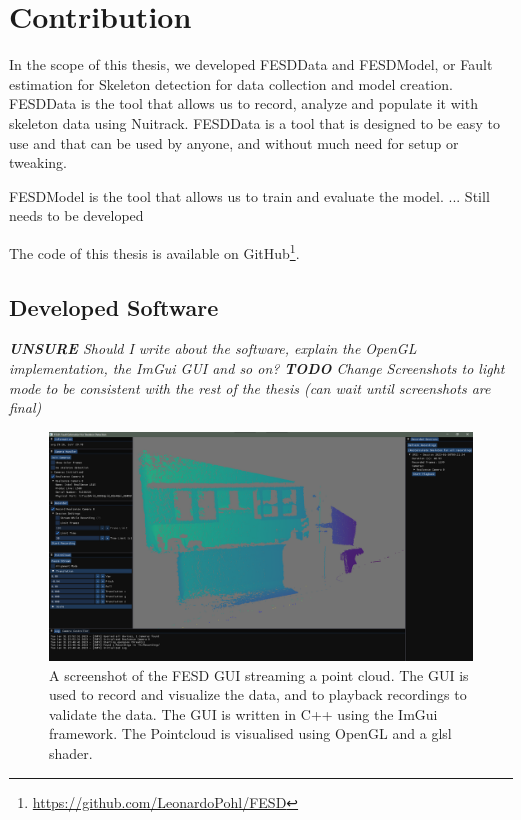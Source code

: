 \section{Contribution}
\label{sec:contribution}

In the scope of this thesis, we developed FESDData and FESDModel, or Fault estimation for Skeleton detection for data collection and model creation. FESDData is the tool that allows us to record, analyze and populate it with skeleton data using Nuitrack. FESDData is a tool that is designed to be easy to use and that can be used by anyone, and without much need for setup or tweaking.

FESDModel is the tool that allows us to train and evaluate the model. ... Still needs to be developed 

The code of this thesis is available on GitHub\footnote{\url{https://github.com/LeonardoPohl/FESD}}.

\subsection{Developed Software}

\textit{\textbf{UNSURE} Should I write about the software, explain the OpenGL implementation, the ImGui GUI and so on?}
\textit{\textbf{TODO} Change Screenshots to light mode to be consistent with the rest of the thesis (can wait until screenshots are final)}

\begin{figure}[ht]
  \centering
  \includegraphics[width=\linewidth]{figures/FESD/all.png}
  \caption[FESD GUI]{A screenshot of the FESD GUI streaming a point cloud. The GUI is used to record and visualize the data, and to playback recordings to validate the data. The GUI is written in C++ using the ImGui framework. The Pointcloud is visualised using OpenGL and a glsl shader.}
  \label{fig:stream_gui}
\end{figure}

